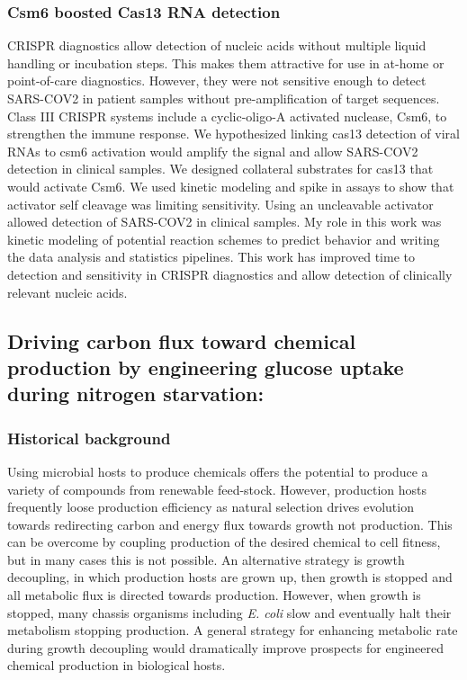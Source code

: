 \documentclass{article}
\begin{document}
\subsubsection{Csm6 boosted Cas13 RNA detection}
CRISPR diagnostics allow detection of nucleic acids without multiple liquid handling or incubation steps.
This makes them attractive for use in at-home or point-of-care diagnostics.
However, they were not sensitive enough to detect SARS-COV2 in patient samples without pre-amplification of target sequences.
Class III CRISPR systems include a cyclic-oligo-A activated nuclease, Csm6, to strengthen the immune response.
We hypothesized linking cas13 detection of viral RNAs to csm6 activation would amplify the signal and allow SARS-COV2 detection in clinical samples.
We designed collateral substrates for cas13 that would activate Csm6.
We used kinetic modeling and spike in assays to show that activator self cleavage was limiting sensitivity.
Using an uncleavable activator allowed detection of SARS-COV2 in clinical samples.
My role in this work was kinetic modeling of potential reaction schemes to predict behavior and writing the data analysis and statistics pipelines.
This work has improved time to detection and sensitivity in CRISPR diagnostics and allow detection of clinically relevant nucleic acids.
%

\nocite{Liu2021-pu,Liu2019-nk}
\printbibliography[heading=none]

\leavevmode\pagebreak


\newrefsection
\subsection{Driving carbon flux toward chemical production by engineering glucose uptake during nitrogen starvation:}
\subsubsection{Historical background}
Using microbial hosts to produce chemicals offers the potential to produce a variety of compounds from renewable feed-stock.
However, production hosts frequently loose production efficiency as natural selection drives evolution towards redirecting carbon and energy flux towards growth not production.
This can be overcome by coupling production of the desired chemical to cell fitness, but in many cases this is not possible.
An alternative strategy is growth decoupling, in which production hosts are grown up, then growth is stopped and all metabolic flux is directed towards production.
However, when growth is stopped, many chassis organisms including \textit{E. coli} slow and eventually halt their metabolism stopping production.
A general strategy for enhancing metabolic rate during growth decoupling would dramatically improve prospects for engineered chemical production in biological hosts.
%
\end{document}
